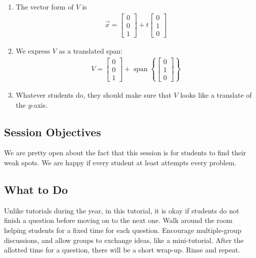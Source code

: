 \documentclass[red]{tutorial}
\newcommand{\R}{\mathbb{R}}
\newcommand{\mat}[1]{\begin{bmatrix} #1 %
\end{bmatrix}}
\DeclareMathOperator{\Span} {span}
\theoremstyle{definition}
\theoremstyle{theorem}
\begin{document}
{\begin{solutions}
\begin{enumerate}
\begin{enumerate}
\begin{equation*}
\begin{bmatrix}[rrr@{\enspace}|@{\enspace}r]
              1 & 0 & 0 & 0 \\
            \end{bmatrix}
          \end{equation*}
        \item
          The vector form of $V$ is
          \begin{align*}
            \vec x = \mat{0\\0\\1} + t\mat{0\\1\\0}
          \end{align*}
        \item
          We express $V$ as a translated span:
          \begin{align*}
            V = \mat{0\\0\\1} + \Span\left\{\mat{0\\1\\0}\right\}
          \end{align*}
        \item
          Whatever students do, they should make sure that $V$ looks like a
          translate of the $y$-axis.
      \end{enumerate}
  \end{enumerate}
\end{solutions}

\begin{instructions}
  \subsection*{Session Objectives}
  We are pretty open about the fact that this session is for students to find
  their weak spots. We are happy if every student at least attempts every
  problem.

  \subsection*{What to Do}
  Unlike tutorials during the year, in this tutorial, 
  it is okay if students do not finish a question before 
  moving on to the next one. Walk around the room helping 
  students for a fixed time for each question. 
  Encourage multiple-group discussions, and allow groups 
  to exchange ideas, like a mini-tutorial. After the 
  allotted time for a question, there will be a short 
  wrap-up. Rinse and repeat.


\end{instructions}}
\end{document}
